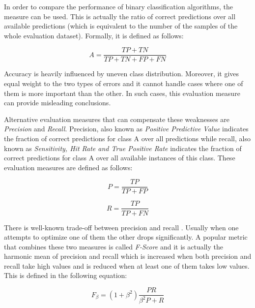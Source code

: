 In order to compare the performance of binary classification algorithms, the  measure can be used. This is actually the ratio of correct predictions over all available predictions (which is equivalent to the number of the samples of the whole evaluation dataset). Formally, it is defined as follows:

\begin{equation}\label{chap:eval_methods:eq:accuracy}
A = \frac {TP + TN} {TP +  TN + FP + FN}
\end{equation}

Accuracy is heavily influenced by uneven class distribution. Moreover, it gives equal weight to the two types of errors and it cannot handle cases where one of them is more important than the other. In such cases, this evaluation measure can provide misleading conclusions. 

Alternative evaluation measures that can compensate these weaknesses are \textit{Precision} and \textit{Recall}. Precision, also known as \textit{Positive Predictive Value} indicates the fraction of correct predictions for class A over all predictions while recall, also known as \textit{Sensitivity, Hit Rate and True Positive Rate} indicates the fraction of correct predictions for class A over all available instances of this class. These evaluation measures are defined as follows: 

\begin{equation}\label{chap:eval_methods:eq:precision}
	P = \frac {TP} {TP + FP}
\end{equation}

\begin{equation}\label{chap:eval_methods:eq:recall}
	R = \frac {TP} {TP + FN}
\end{equation}

There is well-known trade-off between precision and recall \parencite{Weiss2010}. Usually when one attempts to optimize one of them the other drops significantly. A popular metric that combines these two measures is called \textit{F-Score} and it is actually the harmonic mean of precision and recall which is increased when both precision and recall take high values and is reduced when at least one of them takes low values. This is defined in the following equation:

\begin{equation}\label{chap:eval_methods:eq:recall}
	F_{\beta} = (1 + \beta^{2}) \frac {P R} {\beta^{2} P + R}
\end{equation}

